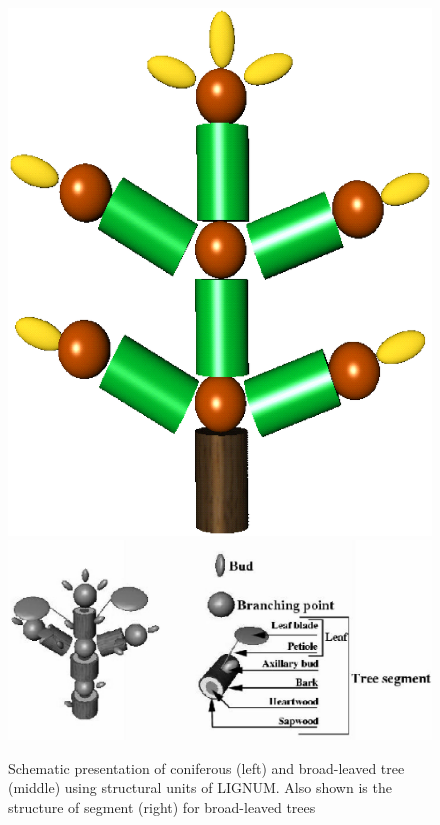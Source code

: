 \begin{figure}[p]
\includegraphics[scale=0.25]{cftree}
\includegraphics[scale=0.6]{hwtree}
\caption{Schematic presentation of coniferous (left) and 
         broad-leaved tree (middle) using structural units of LIGNUM. 
         Also shown is the structure of segment (right) 
         for broad-leaved trees}\label{fig:model} 
\end{figure}
